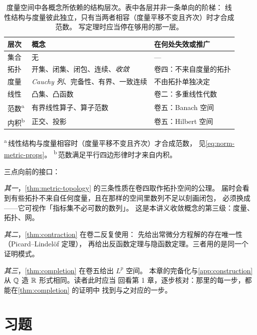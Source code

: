 \begin{table}[!ht]
  \centering
  \caption{度量空间中各概念所依赖的结构层次。表中各层并非一条单向的阶梯：
    线性结构与度量彼此独立，只有当两者相容（度量平移不变且齐次）时才合成范数。
    写定理时应当停在够用的那一层。}
  \label{tab:ch2-structure}
  \begin{tabular}{@{}lll@{}}
    \toprule
    层次 & 概念 & 在何处失效或推广 \\
    \midrule
    集合            & 无                       & --- \\
    拓扑            & 开集、闭集、闭包、连续、\emph{收敛} & 卷四：不来自度量的拓扑 \\
    度量            & \emph{Cauchy 列}、完备性、有界、一致连续 & 不由拓扑单独决定 \\
    线性            & 凸集、凸函数               & 卷二：多重线性代数 \\
    范数\textsuperscript{a}   & 有界线性算子、算子范数       & 卷五：Banach 空间 \\
    内积\textsuperscript{b}   & 正交、投影                 & 卷五：Hilbert 空间 \\
    \bottomrule
  \end{tabular}

  \smallskip
  {\footnotesize
   \textsuperscript{a}\,线性结构与度量相容时（度量平移不变且齐次）才合成范数，
   见\cref{eq:norm-metric-props}。\quad
   \textsuperscript{b}\,范数满足平行四边形律时才来自内积。}
\end{table}

三点向前的接口：

\emph{其一}，\cref{thm:metric-topology} 的三条性质在卷四取作拓扑空间的公理。
届时会看到有些拓扑不来自任何度量，且在那样的空间里数列不足以刻画闭包，
必须换成——它可视作「指标集不必可数的数列」。
这是本讲义收敛概念的第三级：度量、拓扑、网。

\emph{其二}，\cref{thm:contraction} 在卷二反复使用：
先给出常微分方程解的存在唯一性（Picard--Lindelöf 定理），
再给出反函数定理与隐函数定理。三者用的是同一个证明模式。

\emph{其三}，\cref{thm:completion} 在卷五给出 \(L^{p}\) 空间。
本章的完备化与\cref{app:construction} 从 \(\mathbb{Q}\) 造 \(\mathbb{R}\) 形式相同。读者此时应当
回看第 1 章，逐步核对：那里的每一步，都能在\cref{thm:completion} 的证明中
找到与之对应的一步。

\section*{习题}

